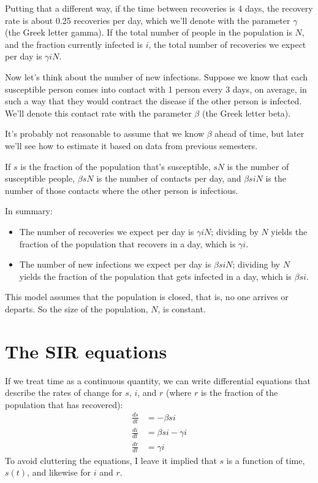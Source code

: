 \documentclass[12pt]{book}
\theoremstyle{exercise}
\begin{document}
Putting that a different way, if the time between recoveries is 4 days, the recovery rate is about 0.25 recoveries per day, which we'll denote with the parameter $\gamma$ (the Greek letter gamma).  If the total number of people in the population is $N$, and the fraction currently infected is $i$, the total number of recoveries we expect per day is $\gamma i N$.

Now let's think about the number of new infections.  Suppose we know that each susceptible person comes into contact with 1 person every 3 days, on average, in such a way that they would contract the disease if the other person is infected.  We'll denote this contact rate with the parameter $\beta$ (the Greek letter beta).

It's probably not reasonable to assume that we know $\beta$ ahead of time, but later we'll see how to estimate it based on data from previous semesters.

If $s$ is the fraction of the population that's susceptible, $s N$ is the number of susceptible people, $\beta s N$ is the number of contacts per day, and $\beta s i N$ is the number of those contacts where the other person is infectious.

In summary:

\begin{itemize}

\item The number of recoveries we expect per day is $\gamma i N$; dividing by $N$ yields the fraction of the population that recovers in a day, which is $\gamma i$.

\item The number of new infections we expect per day is $\beta s i N$; dividing by $N$ yields the fraction of the population that gets infected in a day, which is $\beta s i$.

\end{itemize}

This model assumes that the population is closed, that is, no one arrives or departs.  So the size of the population, $N$, is constant.


\section{The SIR equations}
\label{sireqn}

If we treat time as a continuous quantity, we can write differential equations that describe the rates of change for $s$, $i$, and $r$ (where $r$ is the fraction of the population that has recovered):
%
\begin{align*}
\frac{ds}{dt} &= -\beta s i \\
\frac{di}{dt} &= \beta s i - \gamma i\\
\frac{dr}{dt} &= \gamma i
\end{align*}
%
To avoid cluttering the equations, I leave it implied that $s$ is a function of time, $s(t)$, and likewise for $i$ and $r$.
\end{document}
